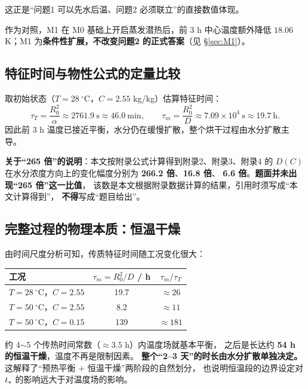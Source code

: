 这正是``问题1 可以先水后温、问题2 必须联立''的直接数值体现。

作为对照，M1 在 M0 基础上开启蒸发潜热后，前 3 h 中心温度额外降低
$18.06$ K；M1 为\textbf{条件性扩展，不改变问题2 的正式答案}（见 \S\ref{sec:M1}）。

\subsection{特征时间与物性公式的定量比较}

取初始状态（$T=28\ ^\circ\mathrm{C}$，$C=2.55$ kg/kg）估算特征时间：
\begin{equation}
  \tau_T=\frac{R_0^{2}}{\alpha}\approx2761.9\ \mathrm{s}\approx46.0\ \mathrm{min},
  \qquad
  \tau_m=\frac{R_0^{2}}{D}\approx7.09\times10^{4}\ \mathrm{s}\approx19.7\ \mathrm{h}.
\end{equation}
因此前 3 h 温度已接近平衡，水分仍在缓慢扩散，整个烘干过程由水分扩散主导。

\textbf{关于``265 倍''的说明}：本文按附录公式计算得到附录2、附录3、附录4 的
$D(C)$ 在水分浓度方向上的变化幅度分别为 \textbf{266.2 倍}、\textbf{16.8 倍}、
\textbf{6.6 倍}。\textbf{题面并未出现``265 倍''这一比值}，
该数是本文根据附录数据计算的结果，引用时须写成``本文计算得到''，
\textbf{不得}写成``题目给出''。

\subsection{完整过程的物理本质：恒温干燥}

由时间尺度分析可知，传质特征时间随工况变化很大：

\begin{table}[H]
  \centering
  \footnotesize
  \begin{tabular}{@{}lcc@{}}
    \toprule
    工况 & $\tau_m=R_0^2/D$ / h & $\tau_m/\tau_T$ \\
    \midrule
    $T=28\ ^\circ$C，$C=2.55$ & 19.7 & $\approx26$ \\
    $T=50\ ^\circ$C，$C=2.55$ & 8.2 & $\approx11$ \\
    $T=50\ ^\circ$C，$C=0.15$ & 139 & $\approx181$ \\
    \bottomrule
  \end{tabular}
\end{table}

约 4$\sim$5 个传热时间常数（$\approx3.5$ h）内温度场就基本平衡，
之后是长达约 \textbf{54 h 的恒温干燥}，温度不再是限制因素。
\textbf{整个``2--3 天''的时长由水分扩散单独决定。}
这解释了``预热平衡 $+$ 恒温干燥''两阶段的自然划分，
也说明恒温段的边界设定对 $t_{*}$ 的影响远大于对温度场的影响。
